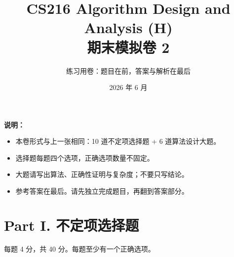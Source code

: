 \documentclass[UTF8,a4paper,11pt]{ctexart}
\title{\textbf{CS216 Algorithm Design and Analysis (H)\\期末模拟卷 2}}
\author{练习用卷：题目在前，答案与解析在最后}
\date{2026 年 6 月}
\begin{document}
\maketitle

\textbf{说明：}
\begin{itemize}
  \item 本卷形式与上一张相同：10 道不定项选择题 + 6 道算法设计大题。
  \item 选择题每题四个选项，正确选项数量不固定。
  \item 大题请写出算法、正确性证明与复杂度；不要只写结论。
  \item 参考答案在最后。请先独立完成题目，再翻到答案部分。
\end{itemize}

\section*{Part I. 不定项选择题}

每题 4 分，共 40 分。每题至少有一个正确选项。
\end{document}
